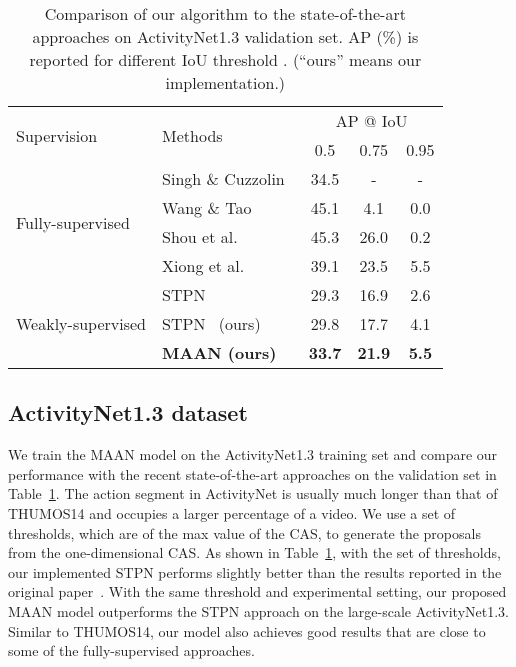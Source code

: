 \documentclass{article} \usepackage{iclr2019_conference,times}
\begin{document}
\begin{table}
\centering
\begin{footnotesize}
\caption{Comparison of our algorithm to the state-of-the-art approaches on ActivityNet1.3 validation set. AP (\%) is reported for different IoU threshold . (``ours'' means our implementation.) }
\label{tab:Anet_state_of_the_art}
\footnotesize
\begin{tabular}{llccc}
\toprule
\multirow{2}{*}{Supervision}       & \multirow{2}{*}{Methods} & \multicolumn{3}{c}{AP @ IoU} \\  
                                   &                          &  0.5     & 0.75      & 0.95   \\ \midrule
\multirow{4}{*}{Fully-supervised}  & Singh \& Cuzzolin~\citep{singh2016untrimmed}        & 34.5     & -        & -      \\
                                   & Wang \& Tao~\citep{Wang2016activitynet}              & 45.1     & 4.1      & 0.0    \\
                                   & Shou et al.~\citep{cdc}              & 45.3     & 26.0     & 0.2    \\
                                   & Xiong et al.~\citep{xiong2017pursuit}             & 39.1     & 23.5     & 5.5    \\ \midrule
\multirow{3}{*}{Weakly-supervised} & STPN~\citep{nguyen2017weakly}                     & 29.3     & 16.9     & 2.6    \\
                                   & STPN~\citep{nguyen2017weakly} (ours)             & 29.8    & 17.7    & 4.1   \\
                                   & \textbf{MAAN (ours)}                & \textbf{33.7}    & \textbf{21.9}    & \textbf{5.5}  \\ \bottomrule
\end{tabular}
\end{footnotesize}
\end{table}

\vspace{-1mm}

\subsection{ActivityNet1.3 dataset}
We train the MAAN model on the ActivityNet1.3 training set and compare our performance with the recent state-of-the-art approaches on the validation set in Table~\ref{tab:Anet_state_of_the_art}. The action segment in ActivityNet is usually much longer than that of THUMOS14 and occupies a larger percentage of a video. We use a set of thresholds, which are  of the max value of the CAS, to generate the proposals from the one-dimensional CAS. As shown in Table~\ref{tab:Anet_state_of_the_art}, with the set of thresholds, our implemented STPN performs slightly better than the results reported in the original paper~\citep{nguyen2017weakly}. With the same threshold and experimental setting, our proposed MAAN model outperforms the STPN approach on the large-scale ActivityNet1.3. Similar to THUMOS14, our model also achieves good results that are close to some of the fully-supervised approaches.       
\end{document}
